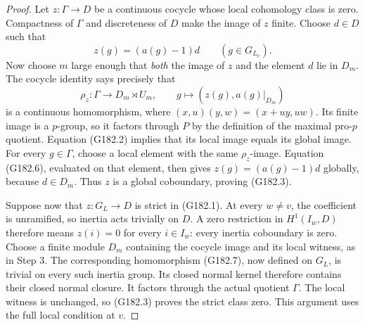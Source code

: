\begin{proof}
Let $z:\Gamma\to D$ be a continuous cocycle whose local cohomology
class is zero.  Compactness of $\Gamma$ and discreteness of $D$
make the image of $z$ finite.
Choose $d\in D$ such that
\[
       z(g)=(a(g)-1)d\qquad(g\in G_{L_v}).
 \tag{G182.6}
\]
Now choose $m$ large enough that \emph{both} the image of $z$ and
the element $d$ lie in $D_m$.
The cocycle identity says precisely that
\[
 \rho_z:\Gamma\longrightarrow D_m\rtimes U_m,
              \qquad g\longmapsto(z(g),a(g)|_{D_m})
 \tag{G182.7}
\]
is a continuous homomorphism, where
$(x,u)(y,w)=(x+uy,uw)$.
Its finite image is a $p$-group, so it factors through $P$ by the
definition of the maximal pro-$p$ quotient.
Equation (G182.2) implies that its local image equals its global image.
For every $g\in\Gamma$, choose a local element with the same
$\rho_z$-image.  Equation (G182.6), evaluated on that element,
then gives $z(g)=(a(g)-1)d$ globally, because $d\in D_m$.
Thus $z$ is a global coboundary, proving (G182.3).

Suppose now that $z:G_L\to D$ is strict in (G182.1).
At every $w\ne v$, the coefficient is unramified, so inertia acts
trivially on $D$.  A zero restriction in $H^1(I_w,D)$ therefore
means $z(i)=0$ for every $i\in I_w$: every inertia coboundary is zero.
Choose a finite module $D_m$ containing the cocycle image and its
local witness, as in Step 3.
The corresponding homomorphism (G182.7), now defined on $G_L$,
is trivial on every such inertia group.  Its closed normal kernel
therefore contains their closed normal closure.
It factors through the actual quotient $\Gamma$.
The local witness is unchanged, so (G182.3) proves the strict class
zero.  This argument uses the full local condition at $v$.
\end{proof}

